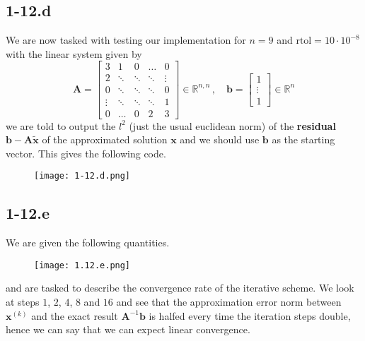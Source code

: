 \documentclass{article}
\newcommand\xk{\mathbf{x}^{\left(k\right)}}
\begin{document}
\subsection*{1-12.d}
We are now tasked with testing our implementation for $n = 9$ and $\text{rtol} = 10 \cdot 10^{-8}$ with the linear system given by
\begin{equation*}
    \mathbf{A} = \begin{bmatrix}
        3 & 1 & 0 & \dots & 0 \\
        2 & \ddots & \ddots & \ddots & \vdots \\
        0 & \ddots & \ddots & \ddots & 0 \\
        \vdots & \ddots & \ddots & \ddots & 1 \\
        0 & \dots & 0 & 2 & 3
    \end{bmatrix} \in \mathbb{R}^{n,n}\,,\quad \mathbf{b} = \begin{bmatrix}
        1 \\
        \vdots \\
        1
    \end{bmatrix} \in \mathbb{R}^{n}
\end{equation*}
we are told to output the $l^{2}$ (just the usual euclidean norm) of the \textbf{residual} $\mathbf{b} - \mathbf{A}\tilde{\mathbf{x}}$ of the approximated solution $\mathbf{x}$ and we should use $\mathbf{b}$ as the starting vector. This gives the following code.

\begin{figure}[!hbt]
    \centering
\texttt{[image: 1-12.d.png]}
\end{figure}
\pagebreak 

\subsection*{1-12.e}
We are given the following quantities.
\begin{figure}[!hbt]
    \centering
\texttt{[image: 1.12.e.png]}
\end{figure}

\noindent and are tasked to describe the convergence rate of the iterative scheme. We look at steps $1$, $2$, $4$, $8$ and $16$ and see that the approximation error norm between $\xk$ and the exact result $\mathbf{A}^{-1}\mathbf{b}$ is halfed every time the iteration steps double, hence we can say that we can expect linear convergence.
\end{document}
